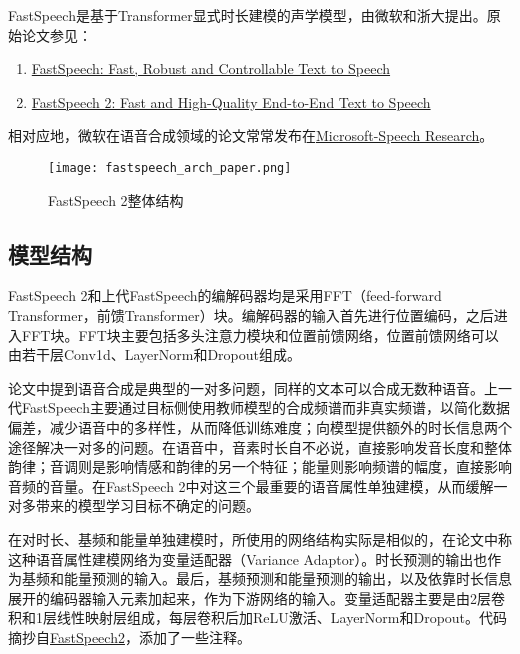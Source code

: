 \documentclass[cn,10pt,math=newtx,citestyle=gb7714-2015,bibstyle=gb7714-2015]{elegantbook}
\begin{document}
FastSpeech是基于Transformer显式时长建模的声学模型，由微软和浙大提出。原始论文参见：

\begin{enumerate}
  \item \href{https://arxiv.org/abs/1905.09263}{FastSpeech: Fast, Robust and Controllable Text to Speech}
  \item \href{https://arxiv.org/abs/2006.04558}{FastSpeech 2: Fast and High-Quality End-to-End Text to Speech}
\end{enumerate}

相对应地，微软在语音合成领域的论文常常发布在\href{https://speechresearch.github.io/}{Microsoft-Speech Research}。

\begin{figure}[htbp]
  \centering
  \texttt{[image: fastspeech\_arch\_paper.png]}
  \caption{FastSpeech 2整体结构 \label{fig:fastspeech_arch_paper}}
\end{figure}

\subsection{模型结构}

FastSpeech 2和上代FastSpeech的编解码器均是采用FFT（feed-forward Transformer，前馈Transformer）块。编解码器的输入首先进行位置编码，之后进入FFT块。FFT块主要包括多头注意力模块和位置前馈网络，位置前馈网络可以由若干层Conv1d、LayerNorm和Dropout组成。

论文中提到语音合成是典型的一对多问题，同样的文本可以合成无数种语音。上一代FastSpeech主要通过目标侧使用教师模型的合成频谱而非真实频谱，以简化数据偏差，减少语音中的多样性，从而降低训练难度；向模型提供额外的时长信息两个途径解决一对多的问题。在语音中，音素时长自不必说，直接影响发音长度和整体韵律；音调则是影响情感和韵律的另一个特征；能量则影响频谱的幅度，直接影响音频的音量。在FastSpeech 2中对这三个最重要的语音属性单独建模，从而缓解一对多带来的模型学习目标不确定的问题。

在对时长、基频和能量单独建模时，所使用的网络结构实际是相似的，在论文中称这种语音属性建模网络为变量适配器（Variance Adaptor）。时长预测的输出也作为基频和能量预测的输入。最后，基频预测和能量预测的输出，以及依靠时长信息展开的编码器输入元素加起来，作为下游网络的输入。变量适配器主要是由2层卷积和1层线性映射层组成，每层卷积后加ReLU激活、LayerNorm和Dropout。代码摘抄自\href{https://github.com/ming024/FastSpeech2}{FastSpeech2}，添加了一些注释。
\end{document}

